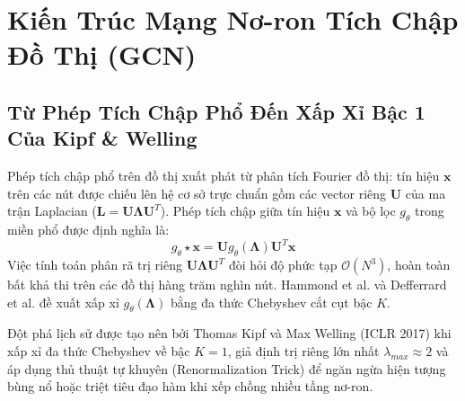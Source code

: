 \documentclass[12pt,a4paper]{report}
\begin{document}
\section{Kiến Trúc Mạng Nơ-ron Tích Chập Đồ Thị (GCN)}

\subsection{Từ Phép Tích Chập Phổ Đến Xấp Xỉ Bậc 1 Của Kipf \& Welling}
Phép tích chập phổ trên đồ thị xuất phát từ phân tích Fourier đồ thị: tín hiệu $\mathbf{x}$ trên các nút được chiếu lên hệ cơ sở trực chuẩn gồm các vector riêng $\mathbf{U}$ của ma trận Laplacian ($\mathbf{L} = \mathbf{U} \mathbf{\Lambda} \mathbf{U}^T$). Phép tích chập giữa tín hiệu $\mathbf{x}$ và bộ lọc $g_\theta$ trong miền phổ được định nghĩa là:
\begin{equation}
    g_\theta \star \mathbf{x} = \mathbf{U} g_\theta(\mathbf{\Lambda}) \mathbf{U}^T \mathbf{x}
\end{equation}
Việc tính toán phân rã trị riêng $\mathbf{U} \mathbf{\Lambda} \mathbf{U}^T$ đòi hỏi độ phức tạp $\mathcal{O}(N^3)$, hoàn toàn bất khả thi trên các đồ thị hàng trăm nghìn nút. Hammond et al. và Defferrard et al. đề xuất xấp xỉ $g_\theta(\mathbf{\Lambda})$ bằng đa thức Chebyshev cắt cụt bậc $K$. 

Đột phá lịch sử được tạo nên bởi Thomas Kipf và Max Welling (ICLR 2017) khi xấp xỉ đa thức Chebyshev về bậc $K=1$, giả định trị riêng lớn nhất $\lambda_{max} \approx 2$ và áp dụng thủ thuật tự khuyên (Renormalization Trick) để ngăn ngừa hiện tượng bùng nổ hoặc triệt tiêu đạo hàm khi xếp chồng nhiều tầng nơ-ron.
\end{document}
